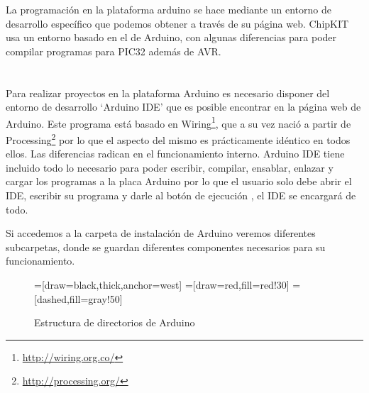 La programación en la plataforma arduino se hace mediante un entorno de desarrollo específico que podemos obtener a través de su página web. ChipKIT usa un entorno basado en el de Arduino, con algunas diferencias para poder compilar programas para PIC32 además de AVR.

\section{}
Para realizar proyectos en la plataforma Arduino es necesario disponer del entorno de desarrollo `Arduino IDE' que es posible encontrar en la página web de Arduino. Este programa está basado en Wiring\footnote{\url{http://wiring.org.co/}}, que a su vez nació a partir de Processing\footnote{\url{http://processing.org/}} por lo que el aspecto del mismo es prácticamente idéntico en todos ellos. Las diferencias radican en el funcionamiento interno. Arduino IDE tiene incluido todo lo necesario para poder escribir, compilar, ensablar, enlazar y cargar los programas a la placa Arduino por lo que el usuario solo debe abrir el IDE, escribir su programa y darle al botón de ejecución , el IDE se encargará de todo.

Si accedemos a la carpeta de instalación de Arduino veremos diferentes subcarpetas, donde se guardan diferentes componentes necesarios para su funcionamiento.
\begin{figure}[H]
\begin{center}
=[draw=black,thick,anchor=west]
=[draw=red,fill=red!30]
=[dashed,fill=gray!50]
\end{center}
\caption{Estructura de directorios de Arduino}
\label{arduino_carpetas}
\end{figure}

